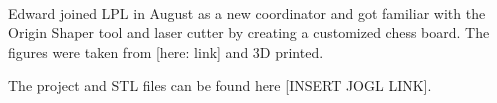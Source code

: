 \documentclass{report}
\begin{document}
\clearpage
\begin{figure}
    \centering
\end{figure}
\clearpage

 \\

Edward joined LPL in August as a new coordinator and got familiar with the Origin Shaper tool and laser cutter by creating a customized chess board. The figures were taken from [here: link] and 3D printed. 

The project and STL files can be found here [INSERT JOGL LINK].

\clearpage
\begin{figure}
    \centering
\end{figure}
\clearpage
\end{document}
